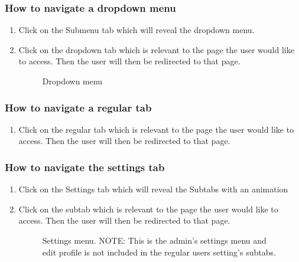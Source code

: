 \documentclass[14pt, a4paper]{article}
\begin{document}
\subsubsection{How to navigate a dropdown menu}
\begin{enumerate}
\item Click on the Submenu tab which will reveal the dropdown menu.
\item Click on the dropdown tab which is relevant to the page the user would like to access. Then the user will then be redirected to that page.
\begin{figure}[H]
\centerline{}
\caption{Dropdown menu}
\label{fig:navbar5}
\end{figure}
\end{enumerate}
\subsubsection{How to navigate a regular tab}
\begin{enumerate}
\item Click on the regular tab which is relevant to the page the user would like to access. Then the user will then be redirected to that page.
\end{enumerate}
\subsubsection{How to navigate the settings tab}
\begin{enumerate}
\item Click on the Settings tab which will reveal the Subtabs with an animation
\item Click on the subtab which is relevant to the page the user would like to access. Then the user will then be redirected to that page.
\begin{figure}[H]
\centerline{}
\caption{Settings menu. NOTE: This is the admin's settings menu and edit profile is not included in the regular users setting's subtabs.}
\label{fig:navbar6}
\end{figure}
\end{enumerate}
\end{document}
